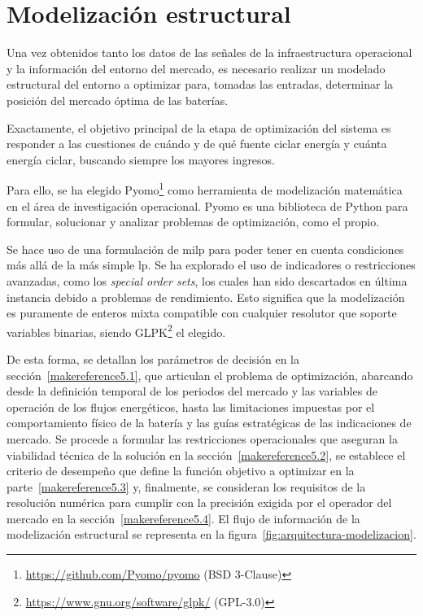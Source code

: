 
\cleardoublepage%

\chapter{Modelización estructural}%
\label{makereference5}

Una vez obtenidos tanto los datos de las señales de la infraestructura operacional y la información del entorno del mercado, es necesario realizar un modelado estructural del entorno a optimizar para, tomadas las entradas, determinar la posición del mercado óptima de las baterías.

Exactamente, el objetivo principal de la etapa de optimización del sistema es responder a las cuestiones de cuándo y de qué fuente ciclar energía y cuánta energía ciclar, buscando siempre los mayores ingresos.

Para ello, se ha elegido Pyomo\footnote{\url{https://github.com/Pyomo/pyomo} (BSD 3-Clause)} como herramienta de modelización matemática en el área de investigación operacional. Pyomo es una biblioteca de Python para formular, solucionar y analizar problemas de optimización, como el propio.

Se hace uso de una formulación de \gls{milp} para poder tener en cuenta condiciones más allá de la más simple \gls{lp}. Se ha explorado el uso de indicadores o restricciones avanzadas, como los \textit{special order sets}, los cuales han sido descartados en última instancia debido a problemas de rendimiento. Esto significa que la modelización es puramente de enteros mixta compatible con cualquier resolutor que soporte variables binarias, siendo GLPK\footnote{\url{https://www.gnu.org/software/glpk/} (GPL-3.0)} el elegido.

De esta forma, se detallan los parámetros de decisión en la sección~\ref{makereference5.1}, que articulan el problema de optimización, abarcando desde la definición temporal de los periodos del mercado y las variables de operación de los flujos energéticos, hasta las limitaciones impuestas por el comportamiento físico de la batería y las guías estratégicas de las indicaciones de mercado. Se procede a formular las restricciones operacionales que aseguran la viabilidad técnica de la solución en la sección~\ref{makereference5.2}, se establece el criterio de desempeño que define la función objetivo a optimizar en la parte~\ref{makereference5.3} y, finalmente, se consideran los requisitos de la resolución numérica para cumplir con la precisión exigida por el operador del mercado en la sección~\ref{makereference5.4}. El flujo de información de la modelización estructural se representa en la figura~\ref{fig:arquitectura-modelizacion}.

